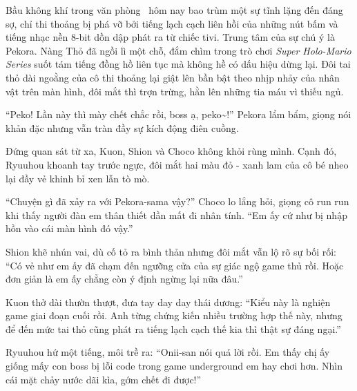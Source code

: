 \documentclass[../main.tex]{subfiles}
\begin{document}

Bầu không khí trong văn phòng \hll\ hôm nay bao trùm một sự tĩnh lặng đến đáng sợ, chỉ thi thoảng bị phá vỡ bởi tiếng lạch cạch liên hồi của những nút bấm và tiếng nhạc nền 8-bit dồn dập phát ra từ chiếc tivi. Trung tâm của sự chú ý là Pekora. Nàng Thỏ đã ngồi lì một chỗ, đắm chìm trong trò chơi \textit{Super Holo-Mario Series} suốt tám tiếng đồng hồ liên tục mà không hề có dấu hiệu dừng lại. Đôi tai thỏ dài ngoằng của cô thi thoảng lại giật lên bần bật theo nhịp nhảy của nhân vật trên màn hình, đôi mắt thì trợn trừng, hằn lên những tia máu vì thiếu ngủ.


``Peko! Lần này thì mày chết chắc rồi, boss ạ, peko\~{}!'' Pekora lẩm bẩm, giọng nói khản đặc nhưng vẫn tràn đầy sự kích động điên cuồng.

Đứng quan sát từ xa, Kuon, Shion và Choco không khỏi rùng mình. Cạnh đó, Ryuuhou khoanh tay trước ngực, đôi mắt hai màu đỏ - xanh lam của cô bé nheo lại đầy vẻ khinh bỉ xen lẫn tò mò.

``Chuyện gì đã xảy ra với Pekora-sama vậy?'' Choco lo lắng hỏi, giọng cô run run khi thấy người đàn em thân thiết dần mất đi nhân tính. ``Em ấy cứ như bị nhập hồn vào cái màn hình đó vậy.''

Shion khẽ nhún vai, dù cố tỏ ra bình thản nhưng đôi mắt vẫn lộ rõ sự bối rối: ``Có vẻ như em ấy đã chạm đến ngưỡng cửa của sự giác ngộ game thủ rồi. Hoặc đơn giản là em ấy chẳng còn ý định ngừng lại nữa đâu.''

Kuon thở dài thườn thượt, đưa tay day day thái dương: ``Kiểu này là nghiện game giai đoạn cuối rồi. Anh từng chứng kiến nhiều trường hợp thế này, nhưng để đến mức tai thỏ cũng phát ra tiếng lạch cạch thế kia thì thật sự đáng ngại.''

Ryuuhou hứ một tiếng, môi trề ra: ``Onii-san nói quá lời rồi. Em thấy chị ấy giống mấy con boss bị lỗi code trong game underground em hay chơi hơn. Nhìn cái mặt chảy nước dãi kìa, gớm chết đi được!''
\end{document}
